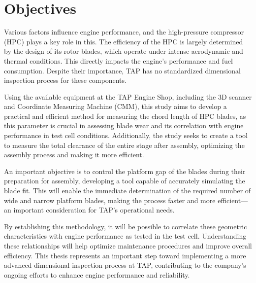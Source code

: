 \section{Objectives}
\label{sec:objectives}

Various factors influence engine performance, and the high-pressure compressor (HPC) plays a key role in this. The efficiency of the HPC is largely determined by the design of its rotor blades, which operate under intense aerodynamic and thermal conditions. This directly impacts the engine’s performance and fuel consumption. Despite their importance, TAP has no standardized dimensional inspection process for these components.

Using the available equipment at the TAP Engine Shop, including the 3D scanner and Coordinate Measuring Machine (CMM), this study aims to develop a practical and efficient method for measuring the chord length of HPC blades, as this parameter is crucial in assessing blade wear and its correlation with engine performance in test cell conditions. Additionally, the study seeks to create a tool to measure the total clearance of the entire stage after assembly, optimizing the assembly process and making it more efficient.

An important objective is to control the platform gap of the blades during their preparation for assembly, developing a tool capable of accurately simulating the blade fit. This will enable the immediate determination of the required number of wide and narrow platform blades, making the process faster and more efficient—an important consideration for TAP’s operational needs.

By establishing this methodology, it will be possible to correlate these geometric characteristics with engine performance as tested in the test cell. Understanding these relationships will help optimize maintenance procedures and improve overall efficiency. This thesis represents an important step toward implementing a more advanced dimensional inspection process at TAP, contributing to the company’s ongoing efforts to enhance engine performance and reliability.







